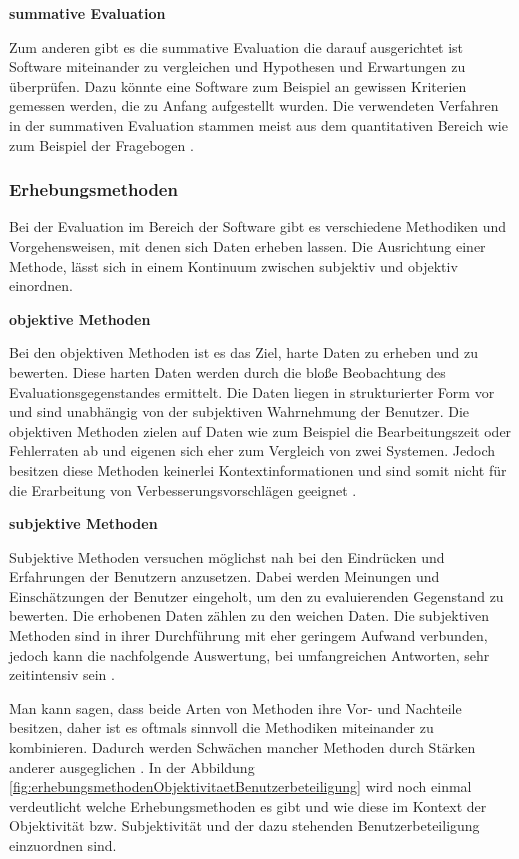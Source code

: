 \textbf{summative Evaluation}

Zum anderen gibt es die summative Evaluation die darauf ausgerichtet ist Software miteinander zu vergleichen und Hypothesen und Erwartungen zu überprüfen. Dazu könnte eine Software zum Beispiel an gewissen Kriterien gemessen werden, die zu Anfang aufgestellt wurden. Die verwendeten Verfahren in der summativen Evaluation stammen meist aus dem quantitativen Bereich wie zum Beispiel der Fragebogen \citep[vgl.][8]{Hegner2003}.

\subsubsection{Erhebungsmethoden}
Bei der Evaluation im Bereich der Software gibt es verschiedene Methodiken und Vorgehensweisen, mit denen sich Daten erheben lassen. Die Ausrichtung einer Methode, lässt sich in einem Kontinuum zwischen subjektiv und objektiv einordnen.

\textbf{objektive Methoden}

Bei den objektiven Methoden ist es das Ziel, \glqq harte \grqq{} Daten zu erheben und zu bewerten. Diese harten Daten werden durch die bloße Beobachtung des Evaluationsgegenstandes ermittelt. Die Daten liegen in strukturierter Form vor und sind unabhängig von der subjektiven Wahrnehmung der Benutzer. Die objektiven Methoden zielen auf Daten wie zum Beispiel die Bearbeitungszeit oder Fehlerraten ab und eigenen sich eher zum Vergleich von zwei Systemen. Jedoch besitzen diese Methoden keinerlei Kontextinformationen und sind somit nicht für die Erarbeitung von Verbesserungsvorschlägen geeignet \citep[vgl.][17]{Hegner2003}.

\textbf{subjektive Methoden}

Subjektive Methoden versuchen möglichst nah bei den Eindrücken und Erfahrungen der Benutzern anzusetzen. Dabei werden Meinungen und Einschätzungen der Benutzer eingeholt, um den zu evaluierenden Gegenstand zu bewerten. Die erhobenen Daten zählen zu den \glqq weichen \grqq{} Daten. Die subjektiven Methoden sind in ihrer Durchführung mit eher geringem Aufwand verbunden, jedoch kann die nachfolgende Auswertung, bei umfangreichen Antworten, sehr zeitintensiv sein \citep[vgl.][18]{Hegner2003}.

Man kann sagen, dass beide Arten von Methoden ihre Vor- und Nachteile besitzen, daher ist es oftmals sinnvoll die Methodiken miteinander zu kombinieren. Dadurch werden Schwächen mancher Methoden durch Stärken anderer ausgeglichen \citep[vgl.][261]{Pruemper1997}. In der Abbildung \ref{fig:erhebungsmethodenObjektivitaetBenutzerbeteiligung} wird noch einmal verdeutlicht welche Erhebungsmethoden es gibt und wie diese im Kontext der Objektivität bzw. Subjektivität und der dazu stehenden Benutzerbeteiligung einzuordnen sind.

